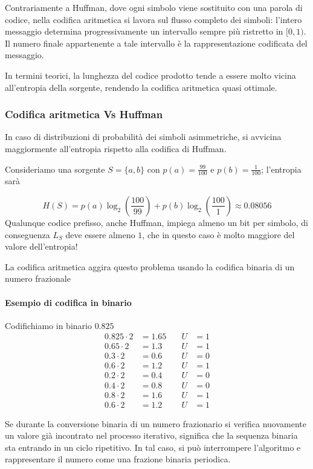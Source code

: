 Contrariamente a Huffman, dove ogni simbolo viene sostituito con una parola di codice, nella codifica aritmetica si lavora sul flusso completo dei simboli: l'intero messaggio determina progressivamente un intervallo sempre più ristretto in $[0,1)$. Il numero finale appartenente a tale intervallo è la rappresentazione codificata del messaggio.

In termini teorici, la lunghezza del codice prodotto tende a essere molto vicina all'entropia della sorgente, rendendo la codifica aritmetica quasi ottimale.


\subsubsection{Codifica aritmetica Vs Huffman}
In caso di distribuzioni di probabilità dei simboli asimmetriche, si avvicina maggiormente all'entropia rispetto alla codifica di Huffman.

Consideriamo una sorgente $S=\{a,b\}$ con $p(a)=\frac{99}{100}$ e $p(b)=\frac{1}{100}$; l'entropia sarà

\[H(S) = p(a)\log_2\left(\frac{100}{99}\right) + p(b)\log_2\left(\frac{100}{1}\right) \approx 0.08056\]
Qualunque codice prefisso, anche Huffman, impiega almeno un bit per simbolo, di conseguenza  $L_S$ deve essere almeno $1$, che in questo caso è molto maggiore del valore dell'entropia!

La codifica aritmetica aggira questo problema usando la codifica binaria di un numero frazionale

\paragraph{Esempio di codifica in binario}
Codifichiamo in binario $0.825$
\begin{align*}
0.825 \cdot 2 &= 1.65 &\quad U &= 1 \\
0.65 \cdot 2  &= 1.3  &\quad U &= 1 \\
0.3 \cdot 2   &= 0.6  &\quad U &= 0 \\
0.6 \cdot 2   &= 1.2  &\quad U &= 1 \\
0.2 \cdot 2   &= 0.4  &\quad U &= 0 \\
0.4 \cdot 2   &= 0.8  &\quad U &= 0 \\
0.8 \cdot 2   &= 1.6  &\quad U &= 1 \\
0.6 \cdot 2   &= 1.2  &\quad U &= 1
\end{align*}

Se durante la conversione binaria di un numero frazionario si verifica nuovamente un valore già incontrato nel processo iterativo, significa che la sequenza binaria sta entrando in un ciclo ripetitivo. In tal caso, si può interrompere l'algoritmo e rappresentare il numero come una frazione binaria periodica.

